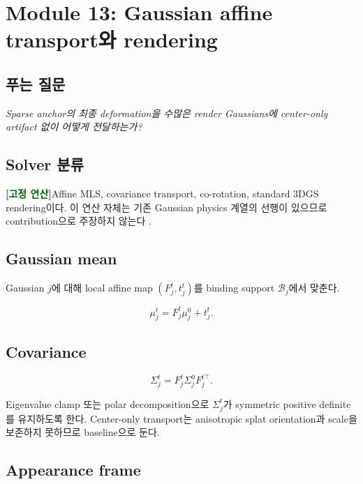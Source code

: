 \documentclass[11pt,a4paper]{article}
\newcommand{\deterministic}{\textcolor{darkgreen}{\textbf{[고정 연산]}}}
\begin{document}
\section{Module 13: Gaussian affine transport와 rendering}

\subsection*{푸는 질문}

\emph{Sparse anchor의 최종 deformation을 수많은 render Gaussians에
center-only artifact 없이 어떻게 전달하는가?}

\subsection*{Solver 분류}

\deterministic Affine MLS, covariance transport, co-rotation,
standard 3DGS rendering이다.
이 연산 자체는 기존 Gaussian physics 계열의 선행이 있으므로 contribution으로 주장하지 않는다
\cite{xie2024physgaussian,yan2026gaussianswaying,shao2025gausim}.

\subsection*{Gaussian mean}

Gaussian \(j\)에 대해 local affine map \((F_j^t,t_j^t)\)를
binding support \(\mathcal B_j\)에서 맞춘다.

\begin{equation}
  \mu_j^t
  =
  F_j^t\mu_j^0+t_j^t.
\end{equation}

\subsection*{Covariance}

\begin{equation}
  \Sigma_j^t
  =
  F_j^t\Sigma_j^0F_j^{t\top}.
  \label{eq:covariance-transport}
\end{equation}

Eigenvalue clamp 또는 polar decomposition으로
\(\Sigma_j^t\)가 symmetric positive definite를 유지하도록 한다.
Center-only transport는 anisotropic splat orientation과 scale을 보존하지 못하므로 baseline으로 둔다.

\subsection*{Appearance frame}
\end{document}
